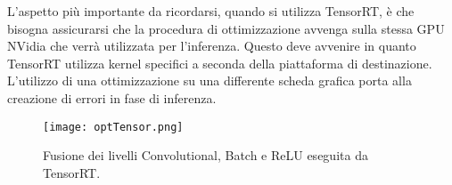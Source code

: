 L'aspetto più importante da ricordarsi, quando si utilizza TensorRT, è che 
bisogna assicurarsi che la procedura di ottimizzazione avvenga sulla stessa 
GPU NVidia che verrà utilizzata per l'inferenza. Questo deve avvenire 
in quanto TensorRT utilizza kernel specifici a seconda della piattaforma 
di destinazione. L'utilizzo di una ottimizzazione su una differente scheda 
grafica porta alla creazione di errori in fase di inferenza. 
\begin{figure}
    \centering
    \texttt{[image: optTensor.png]}
    \centering
    \caption{Fusione dei livelli Convolutional, Batch e ReLU eseguita da TensorRT.}
    \label{fusion_tensorrt}
\end{figure}

